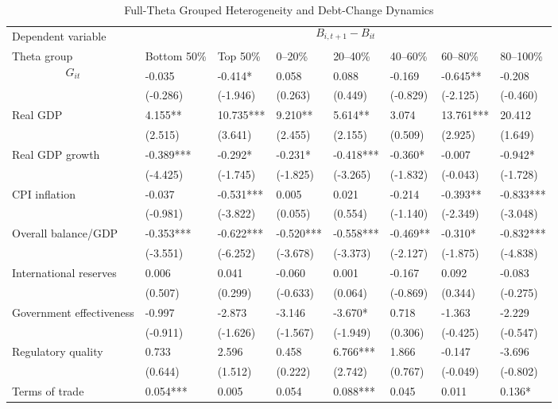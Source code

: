 \begin{table}[H]\centering
\begin{threeparttable}
\caption{Full-Theta Grouped Heterogeneity and Debt-Change Dynamics}
\label{tab:theta_group_heterogeneity_debt}
\scriptsize
\begin{tabularx}{\textwidth}{lYYYYYYY}
\toprule
Dependent variable &  \\
\cmidrule(lr){2-8}
Theta group & Bottom 50\% & Top 50\% & 0--20\% & 20--40\% & 40--60\% & 60--80\% & 80--100\% \\
\midrule
$$G_{it}$$ & -0.035 & -0.414* & 0.058 & 0.088 & -0.169 & -0.645** & -0.208 \\
  & (-0.286) & (-1.946) & (0.263) & (0.449) & (-0.829) & (-2.125) & (-0.460) \\
Real GDP & 4.155** & 10.735*** & 9.210** & 5.614** & 3.074 & 13.761*** & 20.412 \\
  & (2.515) & (3.641) & (2.455) & (2.155) & (0.509) & (2.925) & (1.649) \\
Real GDP growth & -0.389*** & -0.292* & -0.231* & -0.418*** & -0.360* & -0.007 & -0.942* \\
  & (-4.425) & (-1.745) & (-1.825) & (-3.265) & (-1.832) & (-0.043) & (-1.728) \\
CPI inflation & -0.037 & -0.531*** & 0.005 & 0.021 & -0.214 & -0.393** & -0.833*** \\
  & (-0.981) & (-3.822) & (0.055) & (0.554) & (-1.140) & (-2.349) & (-3.048) \\
Overall balance/GDP & -0.353*** & -0.622*** & -0.520*** & -0.558*** & -0.469** & -0.310* & -0.832*** \\
  & (-3.551) & (-6.252) & (-3.678) & (-3.373) & (-2.127) & (-1.875) & (-4.838) \\
International reserves & 0.006 & 0.041 & -0.060 & 0.001 & -0.167 & 0.092 & -0.083 \\
  & (0.507) & (0.299) & (-0.633) & (0.064) & (-0.869) & (0.344) & (-0.275) \\
Government effectiveness & -0.997 & -2.873 & -3.146 & -3.670* & 0.718 & -1.363 & -2.229 \\
  & (-0.911) & (-1.626) & (-1.567) & (-1.949) & (0.306) & (-0.425) & (-0.547) \\
Regulatory quality & 0.733 & 2.596 & 0.458 & 6.766*** & 1.866 & -0.147 & -3.696 \\
  & (0.644) & (1.512) & (0.222) & (2.742) & (0.767) & (-0.049) & (-0.802) \\
Terms of trade & 0.054*** & 0.005 & 0.054 & 0.088*** & 0.045 & 0.011 & 0.136* \\

\end{tabularx}
\end{threeparttable}
\end{table}
